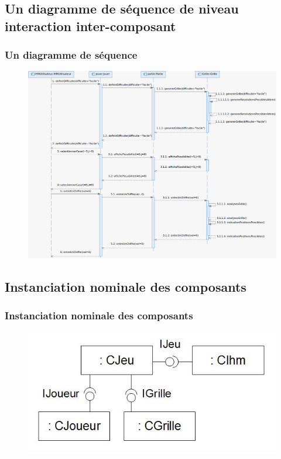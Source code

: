 \documentclass{beamer}
\begin{document}
\subsection{Un diagramme de séquence de niveau interaction inter-composant}
\begin{frame}
  \frametitle{Un diagramme de séquence}
  \begin{figure}[h]
    \includegraphics[scale=0.275]{dia_seq_02.jpg}
  \end{figure}
\end{frame}

\subsection{Instanciation nominale des composants}
\begin{frame}
\frametitle{Instanciation nominale des composants}
  \begin{figure}[h]
    \includegraphics[scale=0.6]{diagramme_instanciation_nominale.JPG}
  \end{figure}
\end{frame}
\end{document}
